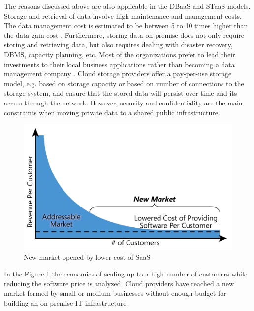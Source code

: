 The reasons discussed above are also applicable in the \ac{DBaaS} and \ac{STaaS} models. Storage and retrieval of data involve high maintenance and management costs. The data management cost is estimated to be between 5 to 10 times higher than the data gain cost \cite{multishares2011}. Furthermore, storing data on-premise does not only require storing and retrieving data, but also requires dealing with disaster recovery, \ac{DBMS}, capacity planning, etc. Most of the organizations prefer to lead their investments to their local business applications rather than becoming a data management company \cite{multishares2011}. Cloud storage providers offer a pay-per-use storage model, e.g. based on storage capacity or based on number of connections to the storage system, and ensure that the stored data will persist over time and its access through the network. However, security and confidentiality are the main constraints when moving private data to a shared public infrastructure. 

\begin{figure}[htb]
	\centering
		\includegraphics[clip, scale=0.5]{./gfx/longtail.png}
	\caption[Multi-tenancy and Long Tail]{New market opened by lower cost of SaaS \cite{ChongB2006}}
	\label{fig:longtail}
\end{figure}

In the Figure \ref{fig:longtail} the economics of scaling up to a high number of customers while reducing the software price is analyzed. Cloud providers have reached a new market formed by small or medium businesses without enough budget for building an on-premise IT infrastructure.

